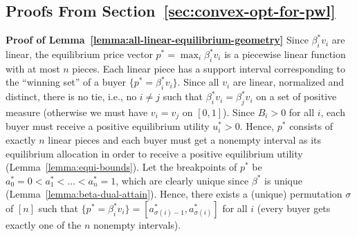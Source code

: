 \subsection{Proofs From Section~\ref{sec:convex-opt-for-pwl}}
	\smallskip\noindent\textbf{Proof of Lemma~\ref{lemma:all-linear-equilibrium-geometry}}
		Since $\beta^*_i v_i$ are linear, the equilibrium price vector $p^* = \max_i \beta^*_i v_i$ is a piecewise linear function with at most $n$ pieces. Each linear piece has a support interval corresponding to the ``winning set'' of a buyer $\{p^* = \beta^*_i v_i\}$.
		Since all $v_i$ are linear, normalized and distinct, there is no tie, i.e., no $i\neq j$ such that $\beta^*_i v_i = \beta^*_j v_i$ on a set of positive measure (otherwise we must have $v_i = v_j$ on $[0,1]$).
		Since $B_i>0$ for all $i$, each buyer must receive a positive equilibrium utility $u^*_i>0$. 
		Hence, $p^*$ consists of exactly $n$ linear pieces and each buyer must get a nonempty interval as its equilibrium allocation in order to receive a positive equilibrium utility (Lemma~\ref{lemma:equi-bounds}).
		Let the breakpoints of $p^*$ be $a^*_0 = 0 < a^*_1 < \dots < a^*_n = 1$, which are clearly unique since $\beta^*$ is unique (Lemma~\ref{lemma:beta-dual-attain}). 
		Hence, there exists a (unique) permutation $\sigma$ of $[n]$ such that $\{ p^* = \beta^*_i v_i \} = [a^*_{\sigma(i)-1}, a^*_{\sigma(i)}]$ for all $i$ (every buyer gets exactly one of the $n$ nonempty intervals). 
		
